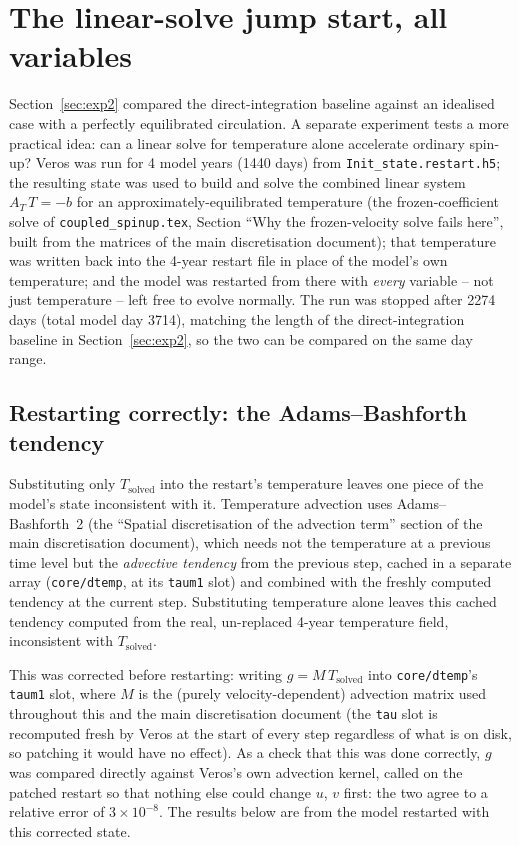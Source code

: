 \documentclass{article}
\begin{document}
\section{The linear-solve jump start, all variables}\label{sec:jumpstart}

Section~\ref{sec:exp2} compared the direct-integration baseline against an idealised case with a perfectly equilibrated circulation. A separate experiment tests a more practical idea: can a linear solve for temperature alone accelerate ordinary spin-up? Veros was run for 4 model years (1440 days) from \texttt{Init\_state.restart.h5}; the resulting state was used to build and solve the combined linear system $A_T\,T=-b$ for an approximately-equilibrated temperature (the frozen-coefficient solve of \texttt{coupled\_spinup.tex}, Section ``Why the frozen-velocity solve fails here'', built from the matrices of the main discretisation document); that temperature was written back into the 4-year restart file in place of the model's own temperature; and the model was restarted from there with \emph{every} variable -- not just temperature -- left free to evolve normally. The run was stopped after 2274 days (total model day 3714), matching the length of the direct-integration baseline in Section~\ref{sec:exp2}, so the two can be compared on the same day range.

\subsection{Restarting correctly: the Adams--Bashforth tendency}\label{sec:jumpstart_ab}

Substituting only $T_\text{solved}$ into the restart's temperature leaves one piece of the model's state inconsistent with it. Temperature advection uses Adams--Bashforth~2 (the ``Spatial discretisation of the advection term'' section of the main discretisation document), which needs not the temperature at a previous time level but the \emph{advective tendency} from the previous step, cached in a separate array (\texttt{core/dtemp}, at its \texttt{taum1} slot) and combined with the freshly computed tendency at the current step. Substituting temperature alone leaves this cached tendency computed from the real, un-replaced 4-year temperature field, inconsistent with $T_\text{solved}$.

This was corrected before restarting: writing $g = M\,T_\text{solved}$ into \texttt{core/dtemp}'s \texttt{taum1} slot, where $M$ is the (purely velocity-dependent) advection matrix used throughout this and the main discretisation document (the \texttt{tau} slot is recomputed fresh by Veros at the start of every step regardless of what is on disk, so patching it would have no effect). As a check that this was done correctly, $g$ was compared directly against Veros's own advection kernel, called on the patched restart so that nothing else could change $u$, $v$ first: the two agree to a relative error of $3\times10^{-8}$. The results below are from the model restarted with this corrected state.
\end{document}
